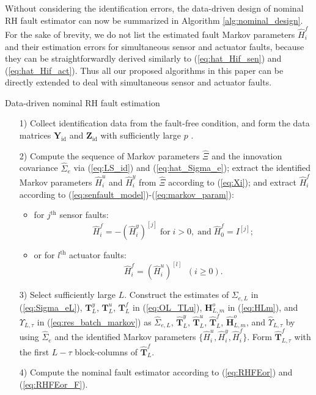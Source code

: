 \documentclass[twocolumn]{autart}
\begin{document}
Without considering the identification errors, the data-driven design of nominal RH fault estimator can now be summarized in Algorithm \ref{alg:nominal_design}. For the sake of brevity, we do not list the estimated fault Markov parameters $\hat H_i^f$ and their estimation errors for simultaneous sensor and actuator faults, because they can be straightforwardly derived similarly to (\ref{eq:hat_Hif_sen}) and (\ref{eq:hat_Hif_act}). Thus all our proposed algorithms in this paper can be directly extended to deal with simultaneous sensor and actuator faults.

\begin{algorithm}
  \caption{Data-driven nominal RH fault estimation}
  \label{alg:nominal_design}
  \begin{algorithmic}
    \State
    \begin{enumerate}
      \item[1)] Collect identification data from the fault-free condition, and form the data matrices $\mathbf{Y}_{\mathrm{id}}$ and $\mathbf{Z}_{\mathrm{id}}$ with sufficiently large $p$ \cite{Veen2012}.
      \item[2)] Compute the sequence of Markov parameters $\hat \Xi$ and the innovation covariance $\hat \Sigma_e$ via  (\ref{eq:LS_id}) and (\ref{eq:hat_Sigma_e}); extract the identified Markov parameters $\hat H_i^u$ and $\hat H_i^y$ from $\hat \Xi$ according to (\ref{eq:Xi}); and extract $\hat H_i^f$ according to (\ref{eq:senfault_model})-(\ref{eq:markov_param}):
			\begin{itemize}
				\item for $j^{\text{th}}$ sensor faults:
					\begin{equation}\label{eq:hat_Hif_sen}
						\hat H_i^f = - ( \hat H_i^{y} )^{[j]} \;\mathrm{for}\; i > 0, \;\mathrm{and}\; \hat H_0^f = I^{[j]};
					\end{equation}
				\item or for $l^{\text{th}}$ actuator faults:
					\begin{equation}\label{eq:hat_Hif_act}
						\hat H_i^f = ( \hat H_i^{u} )^{[l]} \;\; (i \geq 0).
					\end{equation}
			\end{itemize}
      \item[3)] Select sufficiently large $L$.
          Construct the estimates of $\Sigma_{e,L}$ in (\ref{eq:Sigma_eL}), $\mathbf{T}_L^y$, $\mathbf{T}_L^u$, $\mathbf{T}_L^f$ in (\ref{eq:OL_TLu}), $\mathbf{H}_{L,m}^o$ in (\ref{eq:HLm}), and ${\Upsilon}_{L,\tau}$ in (\ref{eq:res_batch_markov}) as $\hat \Sigma_{e,L}$, $\mathbf{\hat T}_L^y$, $\mathbf{\hat T}_L^u$, $\mathbf{\hat T}_{L}^f$, $\mathbf{\hat H}_{L,m}^o$, and $\hat {\Upsilon}_{L,\tau}$ by using
          $\hat \Sigma_e$ and the identified Markov parameters $\{ \hat H_i^u, \hat H_i^y, \hat H_i^f \}$. Form $\mathbf{\hat T}_{L,\tau}^f$ with the first $L-\tau$ block-columns of $\mathbf{\hat T}_{L}^f$.
      \item[4)] Compute the nominal fault estimator according to (\ref{eq:RHFEor}) and (\ref{eq:RHFEor_F}).
    \end{enumerate}
  \end{algorithmic}
\end{algorithm}
\end{document}
